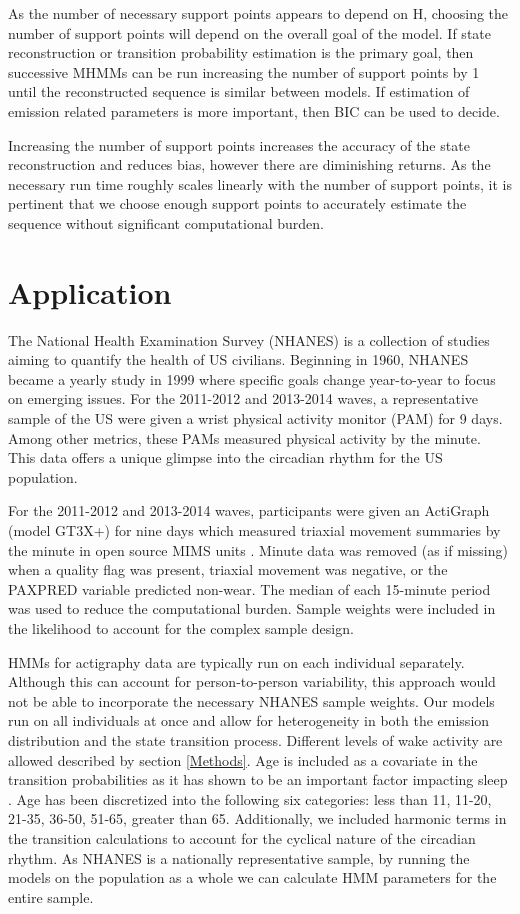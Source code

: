 \documentclass[num-refs]{wiley-article}
\begin{document}
As the number of necessary support points appears to depend on H, choosing the number of support points will depend on the overall goal of the model. If state reconstruction or transition probability estimation is the primary goal, then successive MHMMs can be run increasing the number of support points by 1 until the reconstructed sequence is similar between models. If estimation of emission related parameters is more important, then BIC can be used to decide.  

Increasing the number of support points increases the accuracy of the state reconstruction and reduces bias, however there are diminishing returns. As the necessary run time roughly scales linearly with the number of support points, it is pertinent that we choose enough support points to accurately estimate the sequence without significant computational burden. 

\section{Application}

The National Health Examination Survey (NHANES) is a collection of studies aiming to quantify the health of US civilians. Beginning in 1960, NHANES became a yearly study in 1999 where specific goals change year-to-year to focus on emerging issues. For the 2011-2012 and 2013-2014 waves, a representative sample of the US were given a wrist physical activity monitor (PAM) for 9 days. Among other metrics, these PAMs measured physical activity by the minute. This data offers a unique glimpse into the circadian rhythm for the US population.

For the 2011-2012 and 2013-2014 waves, participants were given an ActiGraph (model GT3X+) for nine days which measured triaxial movement summaries by the minute in open source MIMS units \cite{Dinesh2019}. Minute data was removed (as if missing) when a quality flag was present, triaxial movement was negative, or the PAXPRED variable predicted non-wear. The median of each 15-minute period was used to reduce the computational burden. Sample weights were included in the likelihood \cite{Karchin1998} to account for the complex sample design. 

HMMs for actigraphy data are typically run on each individual separately. Although this can account for person-to-person variability, this approach would not be able to incorporate the necessary NHANES sample weights. Our models run on all individuals at once and allow for heterogeneity in both the emission distribution and the state transition process. Different levels of wake activity are allowed described by section \ref{Methods}. Age is included as a covariate in the transition probabilities as it has shown to be an important factor impacting sleep \cite{Redline2004,Boselli1998}. Age has been discretized into the following six categories: less than 11, 11-20, 21-35, 36-50, 51-65, greater than 65. Additionally, we included harmonic terms in the transition calculations to account for the cyclical nature of the circadian rhythm. As NHANES is a nationally representative sample, by running the models on the population as a whole we can calculate HMM parameters for the entire sample. 
\end{document}
